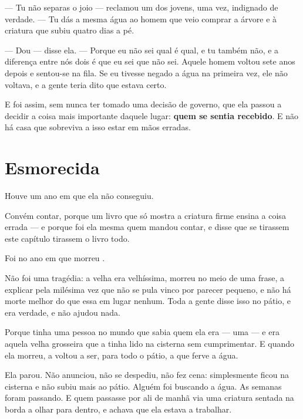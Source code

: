 \documentclass[livro.tex]{subfiles}
\begin{document}
--- Tu não separas o joio --- reclamou um dos jovens, uma vez, indignado de verdade. --- Tu dás
a mesma água ao homem que veio comprar a árvore e à criatura que subiu quatro dias a pé.

--- Dou --- disse ela. --- Porque eu não sei qual é qual, e tu também não, e a diferença entre
nós dois é que eu sei que não sei. Aquele homem voltou sete anos depois e sentou-se na fila. Se
eu tivesse negado a água na primeira vez, ele não voltava, e a gente teria dito que estava certo.

\medskip

E foi assim, sem nunca ter tomado uma decisão de governo, que ela passou a decidir a coisa mais
importante daquele lugar: \textbf{quem se sentia recebido}. E não há casa que sobreviva a isso
estar em mãos erradas.

\chapter{Esmorecida}

Houve um ano em que ela não conseguiu.

Convém contar, porque um livro que só mostra a criatura firme ensina a coisa errada --- e porque
foi ela mesma quem mandou contar, e disse que se tirassem este capítulo tirassem o livro todo.

\medskip

Foi no ano em que morreu \Qui .

Não foi uma tragédia: a velha era velhíssima, morreu no meio de uma frase, a explicar pela
milésima vez que não se pula vinco por parecer pequeno, e não há morte melhor do que essa em
lugar nenhum. Toda a gente disse isso no pátio, e era verdade, e não ajudou nada.

Porque \Lua tinha uma pessoa no mundo que sabia quem ela era --- uma --- e era aquela velha
grosseira que a tinha lido na cisterna sem cumprimentar. E quando ela morreu, a \Lua voltou a
ser, para todo o pátio, a que ferve a água.

\medskip

Ela parou. Não anunciou, não se despediu, não fez cena: simplesmente ficou na cisterna e não
subiu mais ao pátio. Alguém foi buscando a água. As semanas foram passando. E quem passasse por
ali de manhã via uma criatura sentada na borda a olhar para dentro, e achava que ela estava a
trabalhar.
\end{document}

